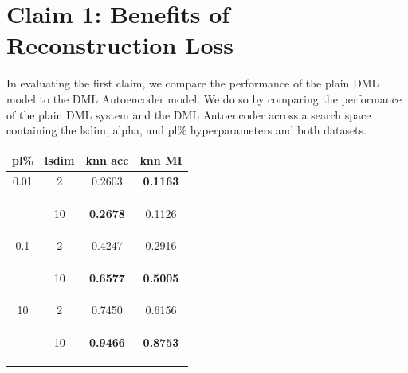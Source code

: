 \documentclass[./dissertation.tex]{subfiles}
\begin{document}
    \section{Claim 1: Benefits of Reconstruction Loss}
    In evaluating the first claim, we compare the performance of the plain DML model to the DML Autoencoder model. We do so by comparing the performance of the plain DML system and the DML Autoencoder across a search space containing the lsdim, alpha, and pl\% hyperparameters and both datasets.
   \begin{table}[]
       \centering
       \begin{tabular}{|c|c|c|c|}
            \hline
            \textbf{pl\%} & \textbf{lsdim} & \textbf{knn acc} & \textbf{knn MI}  \\
            \hline
            0.01 & 2 & 0.2603 & \textbf{0.1163} \\
            & & & \\ 
            & & & \\ 
            & & & \\ 
            & 10 & \textbf{0.2678} & 0.1126 \\ 
            & & & \\ 
            & & & \\ 
            & & & \\ 
            0.1 & 2 & 0.4247 & 0.2916 \\
            & & & \\ 
            & & & \\ 
            & & & \\ 
            & 10 & \textbf{0.6577} & \textbf{0.5005} \\ 
            & & & \\ 
            & & & \\ 
            & & & \\
            10 & 2 & 0.7450 & 0.6156 \\
            & & & \\ 
            & & & \\ 
            & & & \\ 
            & 10 & \textbf{0.9466} & \textbf{0.8753} \\ 
            & & & \\ 
            & & & \\ 
            & & & \\
            \hline
       \end{tabular}
        \begin{tabular}{|c|c|c|c|c|}

\end{tabular}
\end{table}
\end{document}
